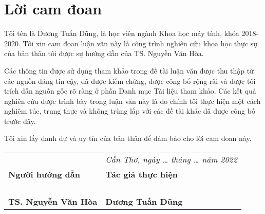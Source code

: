\chapter*{Lời cam đoan}
Tôi tên là Dương Tuấn Dũng, là học viên ngành Khoa học máy tính, khóa 2018-2020. Tôi xin cam đoan luận văn này là công trình nghiên cứu khoa học thực sự của bản thân tôi được sự hướng dẫn của TS. Nguyễn Văn Hòa.

Các thông tin được sử dụng tham khảo trong đề tài luận văn được thu thập từ các nguồn đáng tin cậy, đã được kiểm chứng, được công bố rộng rãi và được tôi trích dẫn nguồn gốc rõ ràng ở phần Danh mục Tài liệu tham khảo. Các kết quả nghiên cứu được trình bày trong luận văn này là  do chính tôi thực hiện một cách nghiêm túc, trung thực và không trùng lắp với các đề tài khác đã được công bố trước đây.

Tôi xin lấy danh dự và uy tín của bản thân để đảm bảo cho lời cam đoan này.

\begin{table}[h]
  \begin{tabular}{ p{7cm}  p{8cm} }
                                   & \emph{Cần Thơ, ngày \ldots{ } tháng \ldots{ } năm 2022}\\
\hspace{20mm}\textbf{Người hướng dẫn}& \hspace{22mm}\textbf{Tác giả thực hiện}\\
									& \\
									& \\
									& \\
         & \\

\hspace{1.6cm}\textbf{TS. Nguyễn Văn Hòa}	&\hspace{2.1cm}\textbf{Dương Tuấn Dũng}\\
                                    
\end{tabular}
\end{table}
